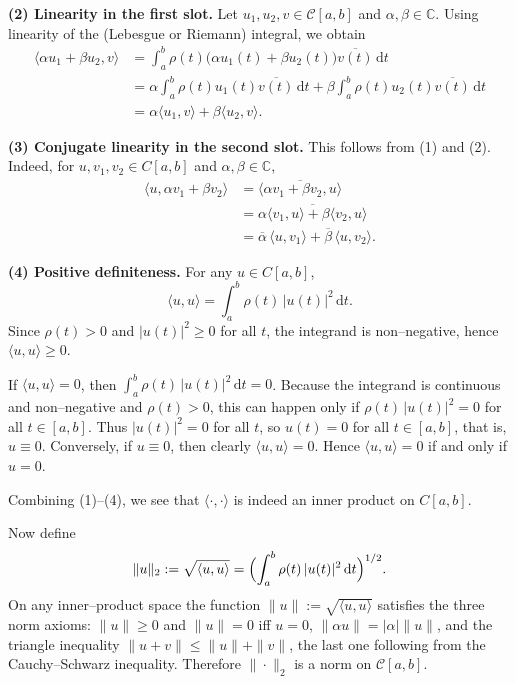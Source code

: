\documentclass[a4paper]{article}
\begin{document}
\medskip\noindent
\textbf{(2) Linearity in the first slot.}
Let \(u_1,u_2,v \in \mathcal{C}[a,b]\) and \(\alpha,\beta\in\mathbb C\).
Using linearity of the (Lebesgue or Riemann) integral, we obtain
\[
\begin{aligned}
\langle \alpha u_1+\beta u_2, v\rangle
 &= \int_a^b \rho(t)\bigl(\alpha u_1(t)+\beta u_2(t)\bigr)\overline{v(t)}\,\mathrm{d}t \\
 &= \alpha \int_a^b \rho(t)u_1(t)\overline{v(t)}\,\mathrm{d}t
   + \beta  \int_a^b \rho(t)u_2(t)\overline{v(t)}\,\mathrm{d}t \\
 &= \alpha\langle u_1,v\rangle + \beta\langle u_2,v\rangle .
\end{aligned}
\]

\medskip\noindent
\textbf{(3) Conjugate linearity in the second slot.}
This follows from (1) and (2). Indeed, for
\(u,v_1,v_2\in C[a,b]\) and \(\alpha,\beta\in\mathbb C\),
\[
\begin{aligned}
\langle u,\alpha v_1+\beta v_2\rangle
 &= \overline{\langle \alpha v_1+\beta v_2,u\rangle} \\
 &= \overline{\alpha\langle v_1,u\rangle + \beta\langle v_2,u\rangle} \\
 &= \overline{\alpha}\,\langle u,v_1\rangle
  + \overline{\beta}\,\langle u,v_2\rangle .
\end{aligned}
\]

\medskip\noindent
\textbf{(4) Positive definiteness.}
For any \(u\in C[a,b]\),
\[
\langle u,u\rangle
 = \int_a^b \rho(t)\,|u(t)|^2\,\mathrm{d}t .
\]
Since \(\rho(t)>0\) and \(|u(t)|^2\ge 0\) for all \(t\), the integrand is
non–negative, hence \(\langle u,u\rangle \ge 0\).

If \(\langle u,u\rangle = 0\), then
\(\int_a^b \rho(t)\,|u(t)|^2\,\mathrm{d}t = 0\).
Because the integrand is continuous and non–negative and \(\rho(t)>0\),
this can happen only if
\(\rho(t)\,|u(t)|^2=0\) for all \(t\in[a,b]\).
Thus \(|u(t)|^2=0\) for all \(t\), so \(u(t)=0\) for all \(t\in[a,b]\),
that is, \(u\equiv 0\).
Conversely, if \(u\equiv 0\), then clearly \(\langle u,u\rangle=0\).
Hence \(\langle u,u\rangle=0\) if and only if \(u=0\).

Combining (1)–(4), we see that \(\langle\cdot,\cdot\rangle\) is indeed an
inner product on \(C[a,b]\).

\medskip
Now define
\[
\|u\|_2 := \sqrt{\langle u,u\rangle}
          = \Bigl( \int_a^b \rho(t)\,|u(t)|^2\,\mathrm{d}t \Bigr)^{1/2}.
\]
On any inner–product space the function
\(\|u\|:=\sqrt{\langle u,u\rangle}\) satisfies the three norm axioms:
\(\|u\|\ge 0\) and \(\|u\|=0\) iff \(u=0\),
\(\|\alpha u\| = |\alpha|\|u\|\), and the triangle inequality
\(\|u+v\|\le\|u\|+\|v\|\), the last one following from the
Cauchy–Schwarz inequality.
Therefore \(\|\cdot\|_2\) is a norm on \(\mathcal{C}[a,b]\).
\end{document}
